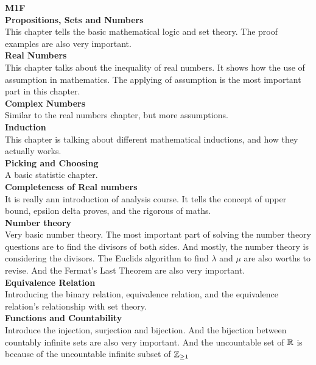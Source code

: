 \documentclass[a4paper]{article}
\begin{document}
\maketitle
{\small
  \noindent\textbf{M1F}\\
  \noindent\textbf{Propositions, Sets and Numbers}\\
  This chapter tells the basic mathematical logic and set theory. The proof examples are also very important.\\
  \noindent\textbf{Real Numbers}\\
  This chapter talks about the inequality of real numbers. It shows how the use of assumption in mathematics. The applying of assumption is the most important part in this chapter.\\
  \noindent\textbf{Complex Numbers}\\
  Similar to the real numbers chapter, but more assumptions.\\
  \noindent\textbf{Induction}\\
  This chapter is talking about different mathematical inductions, and how they actually works.\\
  \noindent\textbf{Picking and Choosing}\\
  A basic statistic chapter.\\
  \noindent\textbf{Completeness of Real numbers}\\
  It is really ann introduction of analysis course. It tells the concept of upper bound, epsilon delta proves, and the rigorous of maths.\\
  \noindent\textbf{Number theory}\\
  Very basic number theory. The most important part of solving the number theory questions are to find the divisors of both sides. And mostly, the number theory is considering the divisors. The Euclids algorithm to find $\lambda$ and $\mu$ are also worths to revise. And the Fermat's Last Theorem are also very important.\\
  \noindent\textbf{Equivalence Relation}\\
  Introducing the binary relation, equivalence relation, and the equivalence relation's relationship with set theory.\\
  \noindent\textbf{Functions and Countability}\\
  Introduce the injection, surjection and bijection. And the bijection between countably infinite sets are also very important. And the uncountable set of $\mathbb{R}$ is because of the uncountable infinite subset of $\mathbb{Z}_{\geq 1}$\\
}
\end{document}
